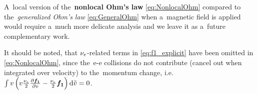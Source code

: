 A~local version of the~{\bf nonlocal Ohm's law} \eqref{eq:NonlocalOhm} 
compared to the~\textit{generalized Ohm's law} \eqref{eq:GeneralOhm} when
a~magnetic field is applied would require a~much more delicate analysis and 
we leave it as a~future complementary work.

It should be noted, that $\nu_{e}$-related terms in \eqref{eq:f1_explicit} 
have been omitted in \eqref{eq:NonlocalOhm}, 
since the~e-e collisions do not contribute 
(cancel out when integrated over velocity) to the~momentum
change, i.e. 
$\int v \left( v\frac{\nu_{e}}{2}\frac{\partial{\boldsymbol{f_1}}}{\partial{v}}
  - \frac{\nu_{e}}{2}\boldsymbol{f_1}\right) \text{d}\tilde{v} = 0$.

 %

